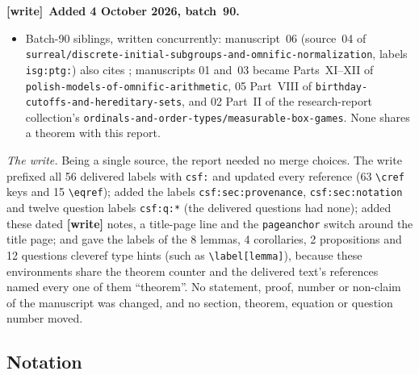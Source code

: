 \documentclass[11pt,a4paper]{article}
\numberwithin{equation}{section}
\theoremstyle{definition}
\theoremstyle{remark}
\newcommand{\repo}[1]{\nolinkurl{#1}}
\newenvironment{writenote}[1][]{\par\smallskip\begingroup\small\raggedright
 \setlength{\parindent}{1.25em}\noindent\textbf{[write]}\if\relax\detokenize{#1}\relax\else~\textbf{#1.}\fi\ }%
 {\par\endgroup\smallskip}
\begin{document}
\begin{writenote}[Added 4 October 2026, batch~90]
\begin{itemize}[leftmargin=1.5em]
\item Batch-90 siblings, written concurrently: manuscript~06 (source~04 of \repo{surreal/discrete-initial-subgroups-and-omnific-normalization}, labels \texttt{isg:ptg:}) also cites \cite{glazer}; manuscripts 01 and~03 became Parts~XI--XII of \repo{polish-models-of-omnific-arithmetic}, 05 Part~VIII of \repo{birthday-cutoffs-and-hereditary-sets}, and 02 Part~II of the research-report collection's \repo{ordinals-and-order-types/measurable-box-games}. None shares a theorem with this report.
\end{itemize}

\emph{The write.} Being a single source, the report needed no merge choices. The write prefixed all 56 delivered labels with \texttt{csf:} and updated every reference (63 \verb|\cref| keys and 15 \verb|\eqref|); added the labels \texttt{csf:sec:provenance}, \texttt{csf:sec:notation} and twelve question labels \texttt{csf:q:*} (the delivered questions had none); added these dated \textbf{[write]} notes, a title-page line and the \texttt{pageanchor} switch around the title page; and gave the labels of the 8 lemmas, 4 corollaries, 2 propositions and 12 questions cleveref type hints (such as \verb|\label[lemma]|), because these environments share the theorem counter and the delivered text's references named every one of them ``theorem''. No statement, proof, number or non-claim of the manuscript was changed, and no section, theorem, equation or question number moved.
\end{writenote}

\subsection{Notation}
\label{csf:sec:notation}
\end{document}
